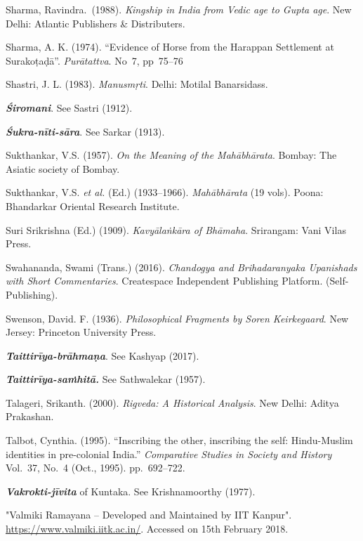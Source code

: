 \begin{thebibliography}{99}
Sharma, Ravindra.\ (1988). {\sl Kingship in India from Vedic age to Gupta age}. New Delhi: Atlantic Publishers \& Distributers. 

Sharma, A. K. (1974). “Evidence of Horse from the Harappan Settlement at Surakoṭaḍā”. {\sl Purātattva}. No~7, pp~75--76

Shastri, J. L. (1983). {\sl Manusmṛti}. Delhi: Motilal Banarsidass. 

{\sl\bfseries Śiromani}. See Sastri (1912).

{\sl\bfseries Śukra-nīti-sāra}. See Sarkar (1913). 

Sukthankar, V.S. (1957). {\sl On the Meaning of the Mahābhārata}. Bombay: The Asiatic society of Bombay. 

Sukthankar, V.S. {\sl et al.} (Ed.) (1933--1966). {\sl Mahābhārata} (19 vols). Poona: Bhandarkar Oriental Research Institute. 

Suri Srikrishna (Ed.) (1909). {\sl Kavyālaṅkāra of Bhāmaha}. Srirangam: Vani Vilas Press. 

Swahananda, Swami (Trans.) (2016). {\sl Chandogya and Brihadaranyaka Upanishads with Short Commentaries}. Createspace Independent Publishing Platform. (Self-Publishing). 

Swenson, David. F. (1936). {\sl Philosophical Fragments by Soren Keirkegaard}. New Jersey: Princeton University Press. 

{\sl\bfseries Taittirīya-brāhmaṇa}. See Kashyap (2017).

{\sl\bfseries Taittirīya-saṁhitā.} See Sathwalekar (1957).

Talageri, Srikanth. (2000). {\sl Rigveda: A Historical Analysis}. New Delhi: Aditya Prakashan. 

Talbot, Cynthia. (1995). “Inscribing the other, inscribing the self: Hindu-Muslim identities in pre-colonial India.” {\sl Comparative Studies in Society and History} Vol.~37, No.~4 (Oct., 1995). pp.~692--722.

{\sl\bfseries Vakrokti-jīvita} of Kuntaka. See Krishnamoorthy (1977).

"Valmiki Ramayana -- Developed and Maintained by IIT Kanpur". \url{https://www.valmiki.iitk.ac.in/}. Accessed on 15th February 2018.


\end{thebibliography}

